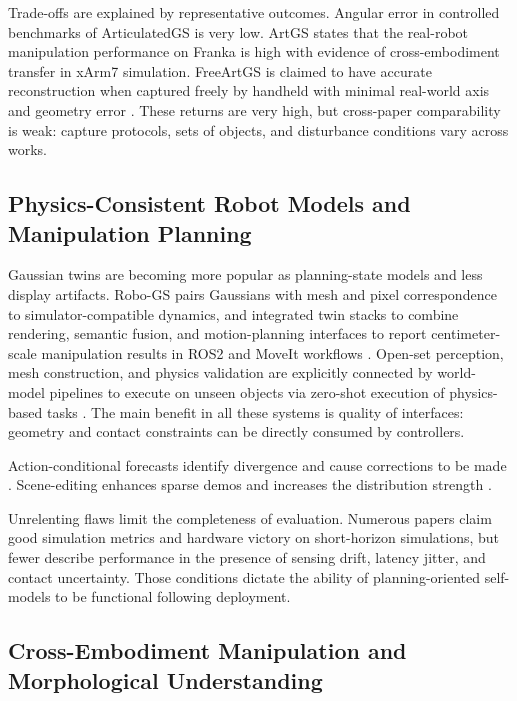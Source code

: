 \documentclass[11pt,a4paper]{article}
\begin{document}
Trade-offs are explained by representative outcomes. Angular error in controlled benchmarks of ArticulatedGS is very low. ArtGS states that the real-robot manipulation performance on Franka is high with evidence of cross-embodiment transfer in xArm7 simulation. FreeArtGS is claimed to have accurate reconstruction when captured freely by handheld with minimal real-world axis and geometry error \cite{guo2025articulatedgs,yu2025artgs,dai2025freeartgs}. These returns are very high, but cross-paper comparability is weak: capture protocols, sets of objects, and disturbance conditions vary across works.

\subsection{Physics-Consistent Robot Models and Manipulation Planning}

Gaussian twins are becoming more popular as planning-state models and less display artifacts. Robo-GS pairs Gaussians with mesh and pixel correspondence to simulator-compatible dynamics, and integrated twin stacks to combine rendering, semantic fusion, and motion-planning interfaces to report centimeter-scale manipulation results in ROS2 and MoveIt workflows \cite{lou2024robogs,sun2026digitaltwin}. Open-set perception, mesh construction, and physics validation are explicitly connected by world-model pipelines to execute on unseen objects via zero-shot execution of physics-based tasks \cite{li2024explicit}. The main benefit in all these systems is quality of interfaces: geometry and contact constraints can be directly consumed by controllers.

Action-conditional forecasts identify divergence and cause corrections to be made \cite{lu2024manigaussian,pan2025selfcorrecting}. Scene-editing enhances sparse demos and increases the distribution strength \cite{yang2025robosplat,tao2025robopearls}.

Unrelenting flaws limit the completeness of evaluation. Numerous papers claim good simulation metrics and hardware victory on short-horizon simulations, but fewer describe performance in the presence of sensing drift, latency jitter, and contact uncertainty. Those conditions dictate the ability of planning-oriented self-models to be functional following deployment.

\subsection{Cross-Embodiment Manipulation and Morphological Understanding}
\end{document}
